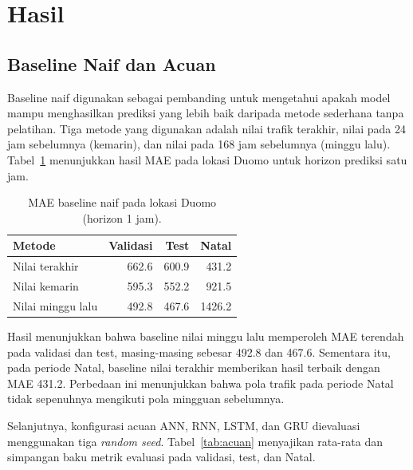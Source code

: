 \documentclass[conference,a4paper]{IEEEtran}
\begin{document}
\section{Hasil}

\subsection{Baseline Naif dan Acuan}
Baseline naif digunakan sebagai pembanding untuk mengetahui apakah model mampu menghasilkan prediksi yang lebih baik daripada metode sederhana tanpa pelatihan. Tiga metode yang digunakan adalah nilai trafik terakhir, nilai pada 24 jam sebelumnya (kemarin), dan nilai pada 168 jam sebelumnya (minggu lalu). Tabel~\ref{tab:baseline} menunjukkan hasil MAE pada lokasi Duomo untuk horizon prediksi satu jam.

\begin{table}[ht]
\centering
\caption{MAE baseline naif pada lokasi Duomo (horizon 1 jam).}
\label{tab:baseline}
\small
\begin{tabular}{lrrr}
\hline
\textbf{Metode} & \textbf{Validasi} & \textbf{Test} & \textbf{Natal} \\
\hline
Nilai terakhir & 662.6 & 600.9 & 431.2 \\
Nilai kemarin & 595.3 & 552.2 & 921.5 \\
Nilai minggu lalu & 492.8 & 467.6 & 1426.2 \\
\hline
\end{tabular}
\end{table}

Hasil menunjukkan bahwa baseline nilai minggu lalu memperoleh MAE terendah pada validasi dan test, masing-masing sebesar 492.8 dan 467.6. Sementara itu, pada periode Natal, baseline nilai terakhir memberikan hasil terbaik dengan MAE 431.2. Perbedaan ini menunjukkan bahwa pola trafik pada periode Natal tidak sepenuhnya mengikuti pola mingguan sebelumnya.

Selanjutnya, konfigurasi acuan ANN, RNN, LSTM, dan GRU dievaluasi menggunakan tiga \textit{random seed}. Tabel~\ref{tab:acuan} menyajikan rata-rata dan simpangan baku metrik evaluasi pada validasi, test, dan Natal.
\end{document}
